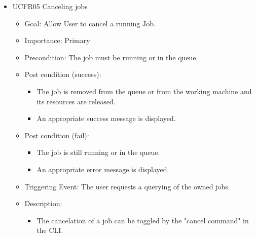 \begin{itemize}
    \item UCFR05 Canceling jobs
    \begin{itemize}
      \item Goal: Allow User to cancel a running Job.
      \item Importance: Primary
      \item Precondition: The job must be running or in the queue.
      \item Post condition (success):
      \begin{itemize}
        \item The job is removed from the queue or from the working machine and its resources are released.
        \item An appropriate success message is displayed.
      \end{itemize}  
      \item Post condition (fail):
      \begin{itemize}
        \item The job is still running or in the queue.
        \item An appropriate error message is displayed.
      \end{itemize}
      \item Triggering Event: The user requests a querying of the owned jobs.
      \item Description:
      \begin{itemize}
        \item   The cancelation of a job can be toggled by the "cancel command" in the CLI.
      \end{itemize}
    \end{itemize}
    

\end{itemize}
